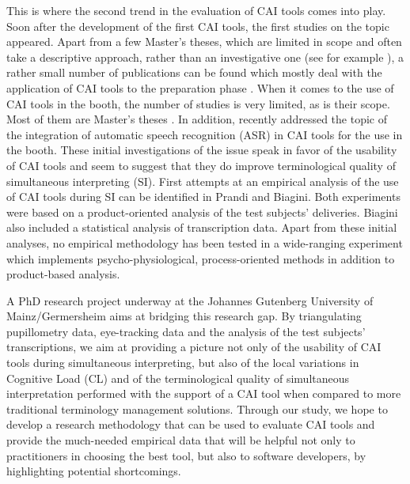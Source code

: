 \documentclass[output=paper]{langsci/langscibook}
\begin{document}
This is where the second trend in the evaluation of \textsc{CAI} tools comes into play. Soon after the development of the first \textsc{CAI} tools, the first studies on the topic appeared. Apart from a few Master’s theses, which are limited in scope and often take a descriptive approach, rather than an investigative one (see for example \citealt{DeMerulis2013}), a rather small number of publications can be found which mostly deal with the application of \textsc{CAI} tools to the preparation phase \citep{Xu2015, Fantinuoli2017a}. When it comes to the use of \textsc{CAI} tools in the booth, the number of studies is very limited, as is their scope. Most of them are Master’s theses \citep{Gacek2015, Biagini2015, Prandi2015a, Prandi2015b}. In addition, \citet{Fantinuoli2017b} recently addressed the topic of the integration of automatic speech recognition (\textsc{ASR}) in \textsc{CAI} tools for the use in the booth. These initial investigations of the issue speak in favor of the usability of \textsc{CAI} tools and seem to suggest that they do improve terminological quality of simultaneous interpreting (\textsc{SI}). First attempts at an empirical analysis of the use of \textsc{CAI} tools during \textsc{SI} can be identified in Prandi and Biagini. Both experiments were based on a product-oriented analysis of the test subjects’ deliveries. Biagini also included a statistical analysis of transcription data. Apart from these initial analyses, no empirical methodology has been tested in a wide-ranging experiment which implements psycho-physiological, process-oriented methods in addition to product-based analysis.

A PhD research project underway at the Johannes Gutenberg University of Mainz/Germersheim \citep{Prandi2016, Prandi2017a, Prandi2017b} aims at bridging this research gap. By triangulating pupillometry data, eye-tracking data and the analysis of the test subjects’ transcriptions, we aim at providing a picture not only of the usability of \textsc{CAI} tools during simultaneous interpreting, but also of the local variations in Cognitive Load (CL) and of the terminological quality of simultaneous interpretation performed with the support of a \textsc{CAI} tool when compared to more traditional terminology management solutions. Through our study, we hope to develop a research methodology that can be used to evaluate \textsc{CAI} tools and provide the much-needed empirical data that will be helpful not only to practitioners in choosing the best tool, but also to software developers, by highlighting potential shortcomings.
\end{document}
